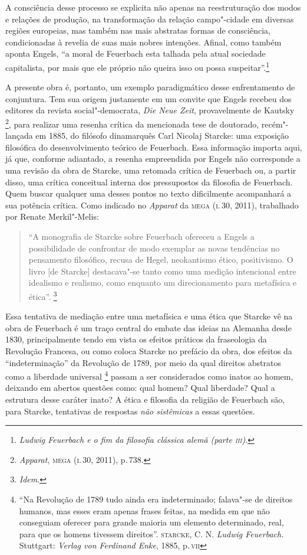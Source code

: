 A consciência desse processo se explicita não apenas na reestruturação
dos modos e relações de produção, na transformação da relação
campo"-cidade em diversas regiões europeias, mas também nas mais
abstratas formas de consciência, condicionadas à revelia de suas mais
nobres intenções. Afinal, como também aponta Engels, ``a moral
de Feuerbach esta
talhada pela atual sociedade capitalista, por mais que ele próprio não
queira isso ou possa suspeitar''.\footnote{\emph{Ludwig Feuerbach e o
  fim da filosofia clássica alemã (parte \textsc{iii})}.}

A presente obra é, portanto, um exemplo paradigmático desse
enfrentamento de conjuntura. Tem sua origem justamente em um convite que
Engels recebeu dos editores da revista social"-democrata, \emph{Die Neue
Zeit}, provavelmente de Kautsky \footnote{\emph{Apparat}, \textsc{mega} (\textsc{i}.\,30,
  2011), p.\,738.}, para realizar uma resenha crítica da mencionada tese de
doutorado, recém"-lançada em 1885, do filósofo dinamarquês Carl Nicolaj
Starcke: uma exposição filosófica do desenvolvimento teórico de
Feuerbach. Essa informação importa aqui, já que, conforme adiantado, a resenha empreendida
por Engels não corresponde a uma revisão da obra de Starcke, uma
retomada crítica de Feuerbach ou, a partir disso, uma crítica conceitual
interna dos pressupostos da filosofia de Feuerbach. Quem buscar qualquer
uma desses pontos no texto dificilmente acompanhará a sua potência
crítica. Como indicado no \emph{Apparat} da \textsc{mega} (\textsc{i}.\,30, 2011),
trabalhado por Renate Merkil"-Melis:

\begin{quote}
``A monografia de Starcke sobre Feuerbach ofereceu a Engels a
possibilidade de confrontar de modo exemplar as novas tendências no
pensamento filosófico, recusa de Hegel, neokantismo ético, positivismo.
O livro {[}de Starcke{]} destacava"-se tanto como uma medição intencional
entre idealismo e realismo, como enquanto um direcionamento para
metafísica e ética''. \footnote{\emph{Idem}.}
\end{quote}

Essa tentativa de mediação entre uma metafísica e uma ética que Starcke
vê na obra de Feuerbach é um traço central do embate das ideias na
Alemanha desde 1830, principalmente tendo em vista os efeitos práticos
da fraseologia da Revolução Francesa, ou como coloca Starcke no prefácio
da obra, dos efeitos da ``indeterminação'' da Revolução de 1789, por
meio da qual direitos abstratos como a liberdade universal \footnote{``Na
  Revolução de 1789 tudo ainda era indeterminado; falava"-se de direitos
  humanos, mas esses eram apenas frases feitas, na medida em que não
  conseguiam oferecer para grande maioria um elemento determinado, real,
  para que os homens tivessem direitos''. \textsc{starcke}, C. N. \emph{Ludwig
  Feuerbach.} Stuttgart: \emph{Verlag von Ferdinand Enke}, 1885, p.\,\textsc{vii}}
passam a ser considerados como inatos ao homem, deixando em abertos
questões como: qual homem? Qual liberdade? Qual a estrutura desse
caráter inato? A ética e filosofia da religião de Feuerbach são, para
Starcke, tentativas de respostas \emph{não sistêmicas} a essas questões.

